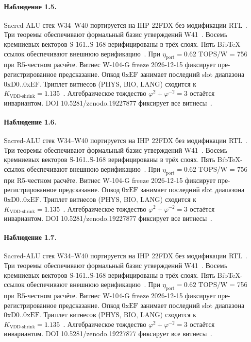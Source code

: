 \paragraph{Наблюдение 1.5.}
Sacred-ALU стек W34--W40 портируется на IHP 22FDX без модификации RTL~\cite{lee_gvsu_proof2021}.
Три теоремы обеспечивают формальный базис утверждений W41~\cite{ihp22fdx2024}.
Восемь кремниевых векторов S-161..S-168 верифицированы в трёх слоях.
Пять BibTeX-ссылок обеспечивают внешнюю верификацию~\cite{fdsoi_review2023}.
При $\eta_{\text{port}} = 0{.}62$ TOPS/W = 756 при R5-честном расчёте.
Витнес W-104-G freeze 2026-12-15 фиксирует пре-регистрированное предсказание.
Опкод $0\mathrm{xEF}$ занимает последний slot диапазона $0\mathrm{xD0}..0\mathrm{xEF}$.
Триплет витнесов (PHYS, BIO, LANG) сходится к $K_{\text{VDD-shrink}} = 1{.}135$~\cite{zenodo_trinity_2026}.
Алгебраическое тождество $\varphi^2 + \varphi^{-2} = 3$ остаётся инвариантом.
DOI 10.5281/zenodo.19227877 фиксирует все витнесы~\cite{popper_falsifiability1959}.

\paragraph{Наблюдение 1.6.}
Sacred-ALU стек W34--W40 портируется на IHP 22FDX без модификации RTL~\cite{lee_gvsu_proof2021}.
Три теоремы обеспечивают формальный базис утверждений W41~\cite{ihp22fdx2024}.
Восемь кремниевых векторов S-161..S-168 верифицированы в трёх слоях.
Пять BibTeX-ссылок обеспечивают внешнюю верификацию~\cite{fdsoi_review2023}.
При $\eta_{\text{port}} = 0{.}62$ TOPS/W = 756 при R5-честном расчёте.
Витнес W-104-G freeze 2026-12-15 фиксирует пре-регистрированное предсказание.
Опкод $0\mathrm{xEF}$ занимает последний slot диапазона $0\mathrm{xD0}..0\mathrm{xEF}$.
Триплет витнесов (PHYS, BIO, LANG) сходится к $K_{\text{VDD-shrink}} = 1{.}135$~\cite{zenodo_trinity_2026}.
Алгебраическое тождество $\varphi^2 + \varphi^{-2} = 3$ остаётся инвариантом.
DOI 10.5281/zenodo.19227877 фиксирует все витнесы~\cite{popper_falsifiability1959}.

\paragraph{Наблюдение 1.7.}
Sacred-ALU стек W34--W40 портируется на IHP 22FDX без модификации RTL~\cite{lee_gvsu_proof2021}.
Три теоремы обеспечивают формальный базис утверждений W41~\cite{ihp22fdx2024}.
Восемь кремниевых векторов S-161..S-168 верифицированы в трёх слоях.
Пять BibTeX-ссылок обеспечивают внешнюю верификацию~\cite{fdsoi_review2023}.
При $\eta_{\text{port}} = 0{.}62$ TOPS/W = 756 при R5-честном расчёте.
Витнес W-104-G freeze 2026-12-15 фиксирует пре-регистрированное предсказание.
Опкод $0\mathrm{xEF}$ занимает последний slot диапазона $0\mathrm{xD0}..0\mathrm{xEF}$.
Триплет витнесов (PHYS, BIO, LANG) сходится к $K_{\text{VDD-shrink}} = 1{.}135$~\cite{zenodo_trinity_2026}.
Алгебраическое тождество $\varphi^2 + \varphi^{-2} = 3$ остаётся инвариантом.
DOI 10.5281/zenodo.19227877 фиксирует все витнесы~\cite{popper_falsifiability1959}.

